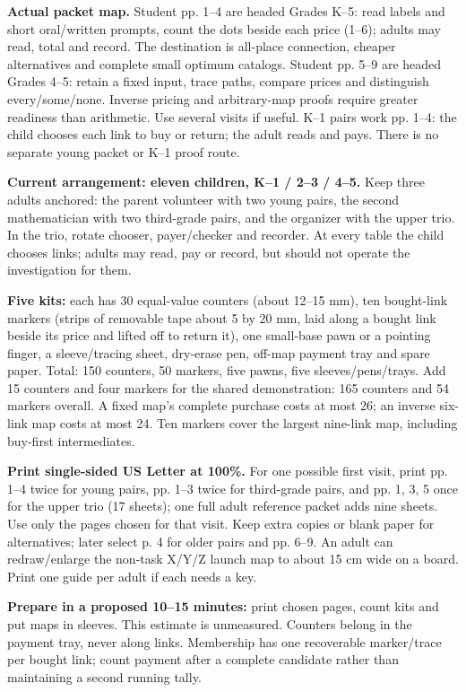 \documentclass[11pt,letterpaper]{article}
\newcommand\topic[1]{\par\vspace{5pt}{\large\bfseries #1}\par}
\begin{document}
\textbf{Actual packet map.} Student pp. 1--4 are headed Grades K--5: read labels and short oral/written prompts, count the dots beside each price (1--6); adults may read, total and record. The destination is all-place connection, cheaper alternatives and complete small optimum catalogs. Student pp. 5--9 are headed Grades 4--5: retain a fixed input, trace paths, compare prices and distinguish every/some/none. Inverse pricing and arbitrary-map proofs require greater readiness than arithmetic. Use several visits if useful. K--1 pairs work pp. 1--4: the child chooses each link to buy or return; the adult reads and pays. There is no separate young packet or K--1 proof route.
\newpage

\topic{Preparation, staffing and launch}
\textbf{Current arrangement: eleven children, K--1 / 2--3 / 4--5.} Keep three adults anchored: the parent volunteer with two young pairs, the second mathematician with two third-grade pairs, and the organizer with the upper trio. In the trio, rotate chooser, payer/checker and recorder. At every table the child chooses links; adults may read, pay or record, but should not operate the investigation for them.

\textbf{Five kits:} each has 30 equal-value counters (about 12--15 mm), ten bought-link markers (strips of removable tape about 5 by 20 mm, laid along a bought link beside its price and lifted off to return it), one small-base pawn or a pointing finger, a sleeve/tracing sheet, dry-erase pen, off-map payment tray and spare paper. Total: 150 counters, 50 markers, five pawns, five sleeves/pens/trays. Add 15 counters and four markers for the shared demonstration: 165 counters and 54 markers overall. A fixed map's complete purchase costs at most 26; an inverse six-link map costs at most 24. Ten markers cover the largest nine-link map, including buy-first intermediates.

\textbf{Print single-sided US Letter at 100\%.} For one possible first visit, print pp. 1--4 twice for young pairs, pp. 1--3 twice for third-grade pairs, and pp. 1, 3, 5 once for the upper trio (17 sheets); one full adult reference packet adds nine sheets. Use only the pages chosen for that visit. Keep extra copies or blank paper for alternatives; later select p. 4 for older pairs and pp. 6--9. An adult can redraw/enlarge the non-task X/Y/Z launch map to about 15 cm wide on a board. Print one guide per adult if each needs a key.

\textbf{Prepare in a proposed 10--15 minutes:} print chosen pages, count kits and put maps in sleeves. This estimate is unmeasured. Counters belong in the payment tray, never along links. Membership has one recoverable marker/trace per bought link; count payment after a complete candidate rather than maintaining a second running tally.
\end{document}
